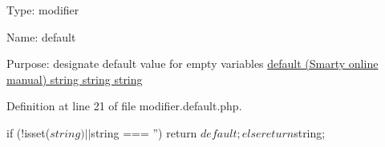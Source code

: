 \-Type\-: modifier\par
 \-Name\-: default\par
 \-Purpose\-: designate default value for empty variables \hyperlink{}{default (\-Smarty online manual)  string  string  string }

\-Definition at line 21 of file modifier.\-default.\-php.


\begin{DoxyCode}
{
    if (!isset($string) || $string === '')
        return $default;
    else
        return $string;
}
\end{DoxyCode}
